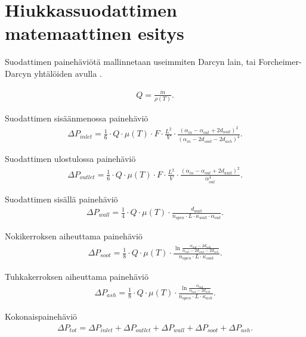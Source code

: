 \section{Hiukkassuodattimen matemaattinen esitys}

%     

Suodattimen painehäviötä mallinnetaan useimmiten Darcyn lain, tai Forcheimer-Darcyn yhtälöiden avulla \cite{dieselnet_wall_flow_monolith}.

\begin{align}
    Q = \frac{\dot{m}}{\rho(T)}.
\end{align}

Suodattimen sisäänmenossa painehäviö
\begin{align}
    \Delta P_{inlet} = \frac{1}{6} \cdot
    Q \cdot \mu(T) 
    \cdot F \cdot \frac{L^2}{V} \cdot \frac{(\alpha_{in}-\alpha_{out}+2 d_{wall})^2}{(\alpha_{in}-2d_{soot}-2d_{ash})^4}.
    \label{eq:PDinletchannel}
\end{align}

Suodattimen ulostulossa painehäviö
\begin{align}
    \Delta P_{outlet} = \frac{1}{6} \cdot
    Q \cdot \mu(T) 
    \cdot F \cdot \frac{L^2}{V} \cdot \frac{(\alpha_{in}-\alpha_{out}+2 d_{wall})^2}{\alpha_{out}^4}.
    \label{eq:PDoutletopen}
\end{align}

Suodattimen sisällä painehäviö 
\begin{align}
    \Delta P_{wall} = \frac{1}{4} \cdot
    Q \cdot \mu(T) 
    \cdot \frac{d_{wall}}
    {n_{open}\cdot L \cdot \kappa_{wall} \cdot \alpha_{out}}.
    \label{eq:PDfilterwall}
\end{align}

Nokikerroksen aiheuttama painehäviö
\begin{align}
    \Delta P_{soot} =  \frac{1}{8} \cdot
    Q \cdot \mu(T) \cdot 
    \frac{\ln{\frac{\alpha_{out}-2d_{ash}}{\alpha_{out}-2d_{soot}-2d_{ash}}}}
    {n_{open}\cdot L \cdot \kappa_{soot}}.
    \label{eq:PDsootlayer}
\end{align}

Tuhkakerroksen aiheuttama painehäviö
\begin{align}
    \Delta P_{ash} = \frac{1}{8} \cdot
    Q \cdot \mu(T) \cdot 
    \frac{\ln{\frac{\alpha_{out}}{\alpha_{out}-2d_{ash}}}}
    {n_{open}\cdot L \cdot \kappa_{ash}}.
    \label{eq:PDashlayer}
\end{align}

Kokonaispainehäviö
\begin{align}
    \Delta P_{tot}  = \Delta P_{inlet} +  \Delta P_{outlet} + \Delta P_{wall} + \Delta P_{soot} +  \Delta P_{ash}.
\end{align}